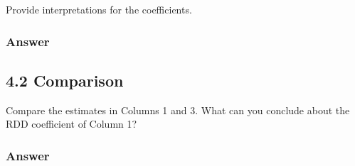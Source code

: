 \documentclass[
  letterpaper,
  DIV=11,
  numbers=noendperiod]{scrartcl}
\begin{document}
Provide interpretations for the coefficients.

\subsubsection{Answer}\label{answer-3}

\subsection{4.2 Comparison}\label{comparison}

Compare the estimates in Columns 1 and 3. What can you conclude about
the RDD coefficient of Column 1?

\subsubsection{Answer}\label{answer-4}
\end{document}
